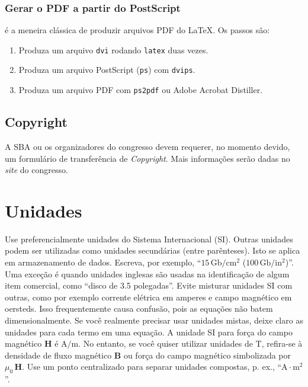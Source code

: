 \subsubsection{Gerar o PDF a partir do PostScript} 
é a meneira clássica de produzir arquivos PDF do \LaTeX. Os passos são: 


\begin{enumerate}
  \item Produza um arquivo \texttt{dvi} rodando \texttt{latex} duas vezes. 
  \item Produza um arquivo PostScript (\texttt{ps}) com \texttt{dvips}.
  \item Produza um arquivo PDF com \texttt{ps2pdf} ou Adobe Acrobat
  Distiller.
\end{enumerate}

\subsection{Copyright}

A SBA ou os organizadores do congresso devem requerer, no momento devido, 
um formulário de transferência de {\em Copyright}. Mais informações serão
dadas no {\em site} do congresso.


\section{Unidades}

Use preferencialmente unidades do Sistema Internacional (SI). Outras unidades
podem ser utilizadas como unidades secundárias (entre parênteses). Isto se aplica
em armazenamento de dados. Escreva,
por exemplo,  ``$15\,\mathrm{Gb}/\mathrm{cm}^2$ ($100\,\mathrm{Gb}/\mathrm{in}^2$)''. 
Uma exceção é quando unidades inglesas são usadas na identificação de algum item
comercial, como ``disco de 3.5 polegadas''. Evite misturar unidades SI com outras, 
como por exemplo corrente elétrica em amperes e campo magnético em oersteds. 
Isso frequentemente causa confusão, pois as equações não batem dimensionalmente. 
Se você realmente precisar usar unidades mistas, deixe claro as unidades para cada
termo em uma equação. A unidade SI para força do campo magnético 
$\mathbf{H}$ é $\mathrm{A}/\mathrm{m}$. No entanto, se você quiser utilizar unidades
de  $\mathrm{T}$, 
refira-se à densidade de fluxo magnético $\mathbf{B}$ ou
força do campo magnético simbolizada por $\mu_0\,\mathbf{H}$. 
Use um ponto centralizado para separar unidades compostas, p. ex.,  
``$\mathrm{A} \cdot \mathrm{m}^2$''.

